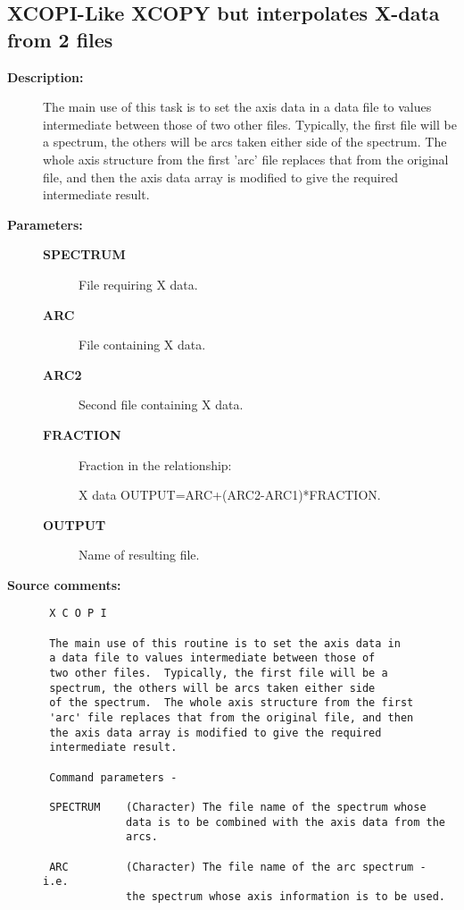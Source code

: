 \subsection{XCOPI-\label{XCOPI}Like XCOPY but interpolates X-data from 2 files}
\begin{description}

\item [{\bf Description:}]
 The main use of this task is to set the axis data in
 a data file to values intermediate between those of
 two other files.  Typically, the first file will be a
 spectrum, the others will be arcs taken either side
 of the spectrum.  The whole axis structure from the first
 'arc' file replaces that from the original file, and then
 the axis data array is modified to give the required
 intermediate result.

\item [{\bf Parameters:}]
\begin{description}
\item [{\bf SPECTRUM}]
 File requiring X data.
\item [{\bf ARC}]
 File containing X data.
\item [{\bf ARC2}]
 Second file containing X data.
\item [{\bf FRACTION}]
 Fraction in the relationship:

    X data OUTPUT=ARC+(ARC2-ARC1)*FRACTION.

\item [{\bf OUTPUT}]
 Name of resulting file.
\end{description}

\item [{\bf Source comments:}]
\begin{verbatim}
 X C O P I

 The main use of this routine is to set the axis data in
 a data file to values intermediate between those of
 two other files.  Typically, the first file will be a
 spectrum, the others will be arcs taken either side
 of the spectrum.  The whole axis structure from the first
 'arc' file replaces that from the original file, and then
 the axis data array is modified to give the required
 intermediate result.

 Command parameters -

 SPECTRUM    (Character) The file name of the spectrum whose
             data is to be combined with the axis data from the
             arcs.

 ARC         (Character) The file name of the arc spectrum - i.e.
             the spectrum whose axis information is to be used.


\end{verbatim}
\end{description}
